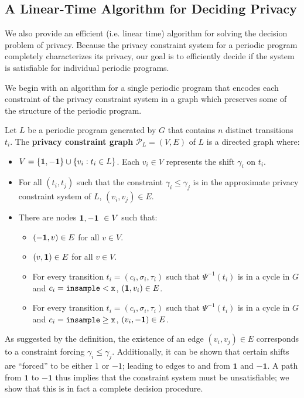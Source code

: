 
\subsection{A Linear-Time Algorithm for Deciding Privacy}\label{svDecisionAlgSection}

We also provide an efficient (i.e. linear time) algorithm for solving the decision problem of privacy.
Because the privacy constraint system for a periodic program completely characterizes its privacy, our goal is to efficiently decide if the system is satisfiable for individual periodic programs.

We begin with an algorithm for a single periodic program that encodes each constraint of the privacy constraint system in a graph which preserves some of the structure of the periodic program. 

\begin{defn}
    Let $L$ be a periodic program generated by $G$ that contains $n$ distinct transitions $t_i$. The \textbf{privacy constraint graph} $\mathcal{P}_L = (V, E)$ of $L$ is a directed graph where: 
    \begin{itemize}
        \item $V = \{{\bf 1, -1}\} \cup \{v_i: t_i\in L\}$. Each $v_i \in V$ represents the shift $\gamma_i$ on $t_i$.
        \item For all $(t_i, t_j)$ such that the constraint $\gamma_i \leq \gamma_j$ is in the approximate privacy constraint system of $L$, $(v_i, v_j) \in E$.
        \item There are nodes ${\bf 1, -1}\ \in V$ such that: 
        \begin{itemize}
            \item $({\bf -1}, v)\in E$ for all $v \in V$.
            \item $(v, {\bf 1})\in E$ for all $v \in V$.
            \item For every transition $t_i = (c_i, \sigma_i, \tau_i)$ such that $\Psi^{-1}(t_i)$ is in a cycle in $G$ and $c_i = \lguard[\texttt{x}]$, $({\bf 1}, v_i) \in E$.
            \item For every transition $t_i = (c_i, \sigma_i, \tau_i)$ such that $\Psi^{-1}(t_i)$ is in a cycle in $G$ and $c_i = \gguard[\texttt{x}]$, $(v_i, {\bf -1}) \in E$. 
        \end{itemize}
    \end{itemize}
\end{defn}

As suggested by the definition, the existence of an edge $(v_i, v_j)\in E$ corresponds to a constraint forcing $\gamma_i \leq \gamma_j$. Additionally, it can be shown that certain shifts are ``forced'' to be either $1$ or $-1$; leading to edges to and from $\mathbf{1}$ and $\mathbf{-1}$. 
A path from $\mathbf{1}$ to $\mathbf{-1}$ thus implies that the constraint system must be unsatisfiable; we show that this is in fact a complete decision procedure.

